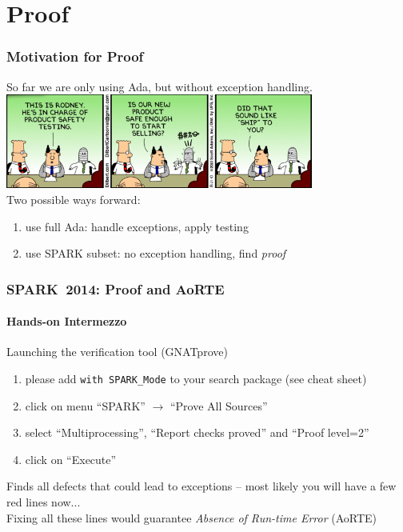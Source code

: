 \section{Proof}
\begin{frame}
  \frametitle{Motivation for Proof}
  So far we are only using Ada, but without exception handling.
  \includegraphics[height=3.1cm]{content/images/spark/testing}\vspace{1em}\\
  Two possible ways forward:
  \begin{enumerate}
  \item use full Ada: handle exceptions, apply testing
  \item use SPARK subset: no exception handling, find \emph{proof}
  \end{enumerate}
  
\end{frame}
\addtocounter{clock}{2}

\begin{frame}
  \frametitle{SPARK~2014: Proof and AoRTE}
  \framesubtitle{Hands-on Intermezzo}
  Launching the verification tool (GNATprove)
  \begin{enumerate}
  \item please add \texttt{with SPARK\_Mode} to your search package (see cheat sheet)
  \item click on menu ``SPARK'' $\rightarrow$ ``Prove All Sources''
  \item select ``Multiprocessing'', ``Report checks proved'' and ``Proof level=2''
  \item click on ``Execute''
  \end{enumerate}
  Finds all defects that could lead to exceptions -- most likely you will have a few red lines now...\\\vspace{1em}
  Fixing all these lines would guarantee \emph{Absence of Run-time Error} (AoRTE)
\end{frame}
\addtocounter{clock}{2}

